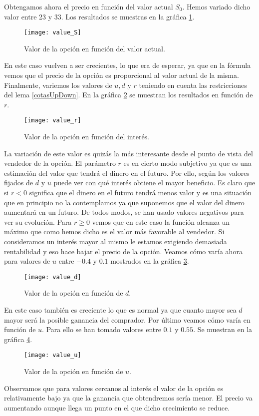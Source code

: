 Obtengamos ahora el precio en función del valor actual $ S_0 $. Hemos variado dicho valor entre 23 y 33. Los resultados se muestras en la gráfica \ref{valueS}. 

\begin{figure}[h!]
	\centering
	\texttt{[image: value\_S]}
	\caption{Valor de la opción en función del valor actual.}
	\label{valueS}
\end{figure}
En este caso vuelven a ser crecientes, lo que era de esperar, ya que en la fórmula vemos que el precio de la opción es proporcional al valor actual de la misma. Finalmente, variemos los valores de  $ u, d \text{ y } r$ teniendo en cuenta las restricciones del lema \ref{cotasUpDown}. En la gráfica \ref{valuer} se muestran los resultados en función de $ r $.
\begin{figure}[h!]
	\centering
	\texttt{[image: value\_r]}
	\caption{Valor de la opción en función del interés.}
	\label{valuer}
\end{figure}
La variación de este valor es quizás la más interesante desde el punto de vista del vendedor de la opción. El parámetro $ r $ es en cierto modo subjetivo ya que es una estimación del valor que tendrá el dinero en el futuro. Por ello, según los valores fijados de $ d $ y $ u $ puede ver con qué interés obtiene el mayor beneficio. Es claro que si $ r < 0 $ significa que el dinero en el futuro tendrá menos valor y es una situación que en principio no la contemplamos ya que suponemos que el valor del dinero aumentará en un futuro. De todos modos, se han usado valores negativos para ver su evolución. Para $ r \geq 0 $ vemos que en este caso la función alcanza un máximo que como hemos dicho es el valor más favorable al vendedor. Si consideramos un interés mayor al mismo le estamos exigiendo demasiada rentabilidad y eso hace bajar el precio de la opción. Veamos cómo varía ahora para valores de $ u $ entre $ -0.4 $ y $ 0.1 $ mostrados en la gráfica \ref{valued}.
\begin{figure}[h!]
	\centering
	\texttt{[image: value\_d]}
	\caption{Valor de la opción en función de $ d $.}
	\label{valued}
\end{figure}
En este caso también es creciente lo que es normal ya que cuanto mayor sea $ d $ mayor será la posible ganancia del comprador. Por último veamos cómo varía en función de $ u $. Para ello se han tomado valores entre $ 0.1 $ y $ 0.55 $. Se muestran en la gráfica \ref{valueu}.\\
\begin{figure}[h!]
	\centering
	\texttt{[image: value\_u]}
	\caption{Valor de la opción en función de $ u $.}
	\label{valueu}
\end{figure}

Observamos que para valores cercanos al interés el valor de la opción es relativamente bajo ya que la ganancia que obtendremos sería menor. El precio va aumentando aunque llega un punto en el que dicho crecimiento se reduce.